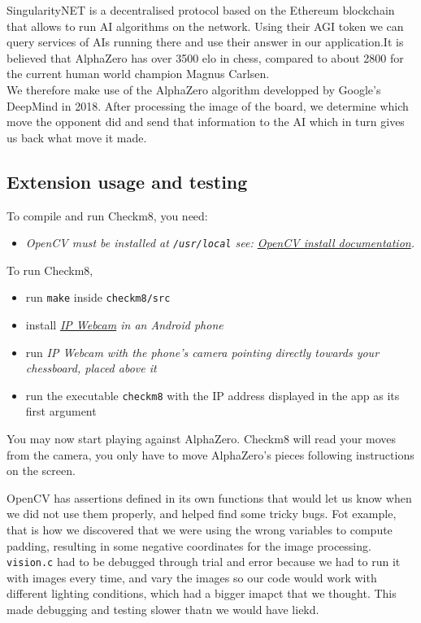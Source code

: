 \documentclass[11pt]{article}
\begin{document}
SingularityNET is a decentralised protocol based on the Ethereum blockchain that
allows to run AI algorithms on the network. Using their AGI token we can query
services of AIs running there and use their answer in our application.It is
believed that AlphaZero has over 3500 elo in chess, compared to about 2800 for
the current human world champion Magnus Carlsen.\\ We therefore make use of the
AlphaZero algorithm developped by Google's DeepMind in 2018. After processing
the image of the board, we determine which move the opponent did and send that
information to the AI which in turn gives us back what move it made.

\subsection{Extension usage and testing}
To compile and run Checkm8, you need:
\begin{itemize}
\item \em OpenCV \em must be installed at
\texttt{/usr/local} see:
\href{https://docs.opencv.org/3.4.6/d7/d9f/tutorial_linux_install.html}{OpenCV install documentation}.
\end{itemize}
To run Checkm8, 
\begin{itemize}
  \item run \texttt{make} inside \texttt{checkm8/src} 
  \item install \em \href{https://play.google.com/store/apps/details?id=com.pas.webcam&hl=en_GB}{IP Webcam} \em
  in an Android phone
  \item run \em IP Webcam \em with the phone's camera pointing directly towards your chessboard,
  placed above it
  \item run the executable \texttt{checkm8} with the IP address displayed
  in the app as its first argument
\end{itemize}
You may now start playing against AlphaZero. Checkm8 will read your moves
from the camera, you only have to move AlphaZero's pieces following 
instructions on the screen.


OpenCV has assertions defined in its own functions that would let us 
know when we did not use them properly, and helped find some tricky bugs.
Fot example, that is how we discovered that we were using the wrong variables
to compute padding, resulting in some negative coordinates for the image
processing.
\texttt{vision.c} had to be debugged through trial and error because we
had to run it with images every time, and vary the images so our code would
work with different lighting conditions, which had a bigger imapct that we 
thought. This made debugging and testing slower thatn we would have liekd.
\end{document}
